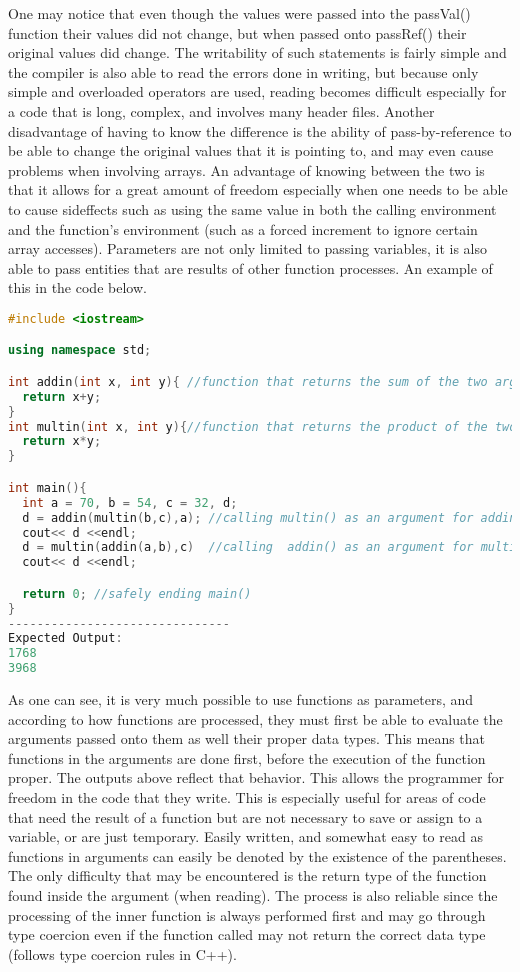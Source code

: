 \documentclass[12pt]{article}
\begin{document}
One may notice that even though the values were passed into the passVal() function their values did not change, but when passed onto passRef() their original values did change. The writability of such statements is fairly simple and the compiler is also able to read the errors done in writing, but because only simple and overloaded operators are used, reading becomes difficult especially for a code that is long, complex, and involves many header files. Another disadvantage of having to know the difference is the ability of pass-by-reference to be able to change the original values that it is pointing to, and may even cause problems when involving arrays. An advantage of knowing between the two is that it allows for a great amount of freedom especially when one needs to be able to cause sideffects such as using the same value in both the calling environment and the function's environment (such as a forced increment to ignore certain array accesses). Parameters are not only limited to passing variables, it is also able to pass entities that are results of other function processes. An example of this in the code below.
\begin{lstlisting}[language=C++]
#include <iostream>

using namespace std;

int addin(int x, int y){ //function that returns the sum of the two arguments
  return x+y;
}
int multin(int x, int y){//function that returns the product of the two arguments
  return x*y;
}

int main(){
  int a = 70, b = 54, c = 32, d;
  d = addin(multin(b,c),a); //calling multin() as an argument for addin()
  cout<< d <<endl;
  d = multin(addin(a,b),c)  //calling  addin() as an argument for multin() 
  cout<< d <<endl;

  return 0; //safely ending main()
}
-------------------------------
Expected Output:
1768
3968
\end{lstlisting}
As one can see, it is very much possible to use functions as parameters, and according to how functions are processed, they must first be able to evaluate the arguments passed onto them as well their proper data types. This means that functions in the arguments are done first, before the execution of the function proper. The outputs above reflect that behavior. This allows the programmer for freedom in the code that they write. This is especially useful for areas of code that need the result of a function but are not necessary to save or assign to a variable, or are just temporary. Easily written, and somewhat easy to read as functions in arguments can easily be denoted by the existence of the parentheses. The only difficulty that may be encountered is the return type of the function found inside the argument (when reading). The process is also reliable since the processing of the inner function is always performed first and may go through type coercion even if the function called may not return the correct data type (follows type coercion rules in C++). 
\end{document}
